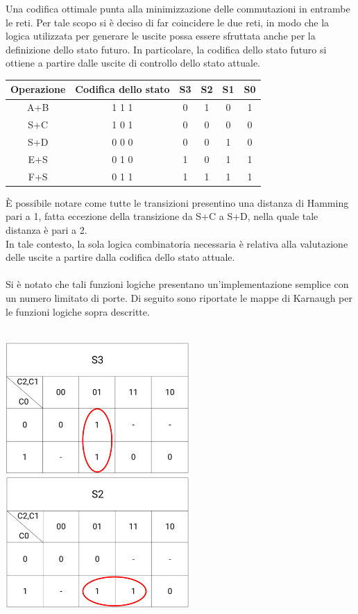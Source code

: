 \documentclass[11pt,  english, makeidx, a4paper, titlepage, oneside]{book}
\begin{document}
Una codifica ottimale punta alla minimizzazione delle commutazioni in entrambe le reti. Per tale scopo si è deciso di far coincidere le due reti, in modo che la logica utilizzata per generare le uscite possa essere sfruttata anche per la definizione dello stato futuro. In particolare, la codifica dello stato futuro si ottiene a partire dalle uscite di controllo dello stato attuale.
\\
\begin{center}
	\begin{tabular}{|c||c||c|c|c|c|}
	\hline
	Operazione & Codifica dello stato & S3 & S2 & S1 & S0 \\ 
	\hline
	A+B & 1 1 1 & 0 & 1 & 0 & 1 \\
	\hline
	S+C & 1 0 1 & 0 & 0 & 0 & 0 \\
	\hline
	S+D & 0 0 0 & 0 & 0 & 1 & 0 \\
	\hline
	E+S & 0 1 0 & 1 & 0 & 1 & 1 \\
	\hline
	F+S & 0 1 1 & 1 & 1 & 1 & 1 \\
	\hline
	\end{tabular}	
\end{center}
\vspace{0.3cm}  
È possibile notare come tutte le transizioni presentino una distanza di Hamming pari a 1, fatta eccezione della transizione da S+C a S+D, nella quale tale distanza è pari a 2.
\\
In tale contesto, la sola logica combinatoria necessaria è relativa alla valutazione delle uscite a partire dalla codifica dello stato attuale.
\\\\
Si è notato che tali funzioni logiche presentano un'implementazione semplice con un numero limitato di porte. Di seguito sono riportate le mappe di Karnaugh per le funzioni logiche sopra descritte.
\\\\
\centerline{\includegraphics[width=7cm]{./img/Lab_2/K_S3.png}
			\includegraphics[width=7cm]{./img/Lab_2/K_S2.png}}
\end{document}
